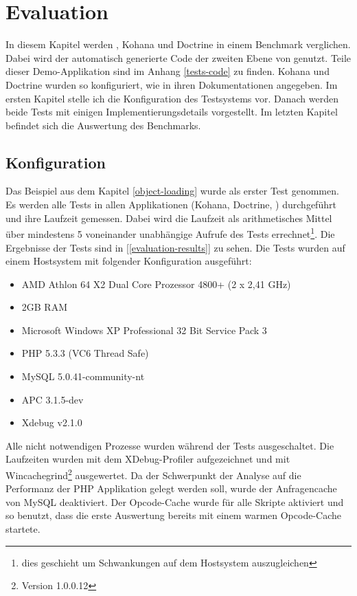 \chapter{Evaluation} \label{evaluation}

In diesem Kapitel werden \PSCORM, Kohana und Doctrine in einem Benchmark verglichen. Dabei wird der automatisch generierte Code der zweiten Ebene von \PSCORM genutzt. Teile dieser Demo-Applikation sind im Anhang \ref{tests-code} zu finden. Kohana und Doctrine wurden so konfiguriert, wie in ihren Dokumentationen angegeben. Im ersten Kapitel stelle ich die Konfiguration des Testsystems vor. Danach werden beide Tests mit einigen Implementierungsdetails vorgestellt. Im letzten Kapitel befindet sich die Auswertung des Benchmarks.

\section{Konfiguration}
Das Beispiel aus dem Kapitel \ref{object-loading} wurde als erster Test genommen. Es werden alle Tests in allen Applikationen (Kohana, Doctrine, \PSCORM) durchgeführt und ihre Laufzeit gemessen. Dabei wird die Laufzeit als arithmetisches Mittel über mindestens 5 voneinander unabhängige Aufrufe des Tests errechnet\footnote{dies geschieht um Schwankungen auf dem Hostsystem auszugleichen}. Die Ergebnisse der Tests sind in [\ref{evaluation-results}] zu sehen. Die Tests wurden auf einem Hostsystem mit folgender Konfiguration ausgeführt:
\begin{itemize}
\item AMD Athlon 64 X2 Dual Core Prozessor 4800+ (2 x 2,41 GHz)
\item 2GB RAM
\item Microsoft Windows XP Professional 32 Bit Service Pack 3
\item PHP 5.3.3 (VC6 Thread Safe)
\item MySQL 5.0.41-community-nt
\item APC 3.1.5-dev 
\item Xdebug v2.1.0
\end{itemize}
Alle nicht notwendigen Prozesse wurden während der Tests ausgeschaltet. Die Laufzeiten wurden mit dem XDebug-Profiler aufgezeichnet und mit Wincachegrind\footnote{Version 1.0.0.12} ausgewertet. Da der Schwerpunkt der Analyse auf die Performanz der PHP Applikation gelegt werden soll, wurde der Anfragencache von MySQL deaktiviert. Der Opcode-Cache  wurde für alle Skripte aktiviert und so benutzt, dass die erste Auswertung bereits mit einem warmen Opcode-Cache startete.

